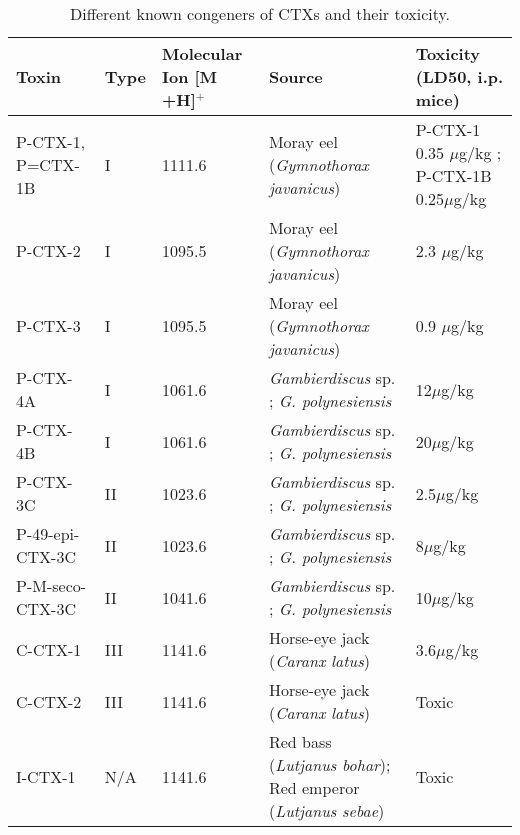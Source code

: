 \documentclass[12pt]{article}
\begin{document}
\begin{table}
\caption{Different known congeners of CTXs and their toxicity.}
\begin{tabular}{ |  p{2cm} | p{1.5cm} | p{2.5cm} | p{4cm} | p{4cm} | }
\hline
\textbf{Toxin} & \textbf{Type} & \textbf{Molecular Ion [M +H]$^{+}$} & \textbf{Source} & \textbf{Toxicity (LD50, i.p. mice)} \\
\hline
P-CTX-1, P=CTX-1B & I & 1111.6 & Moray eel (\emph{Gymnothorax javanicus}) \cite{murata1990structures,lewis1991purification} & P-CTX-1 0.35 $\mu$g/kg \cite{murata1990structures}; P-CTX-1B 0.25$\mu$g/kg \cite{lewis1991purification} \\
\hline
P-CTX-2 & I & 1095.5 \cite{lewis1991purification} & Moray eel (\emph{Gymnothorax javanicus}) \cite{lewis1991purification} & 2.3 $\mu$g/kg \cite{lewis1991purification} \\
\hline
 P-CTX-3 & I & 1095.5 \cite{lewis1991purification} & Moray eel (\emph{Gymnothorax javanicus}) \cite{lewis1991purification} & 0.9 $\mu$g/kg \cite{lewis1991purification} \\
\hline
 P-CTX-4A & I & 1061.6 \cite{yasumoto2000structural} & \emph{Gambierdiscus} sp. \cite{yasumoto2000structural}; \emph{G. polynesiensis} \cite{chinain2010growth} & 12$\mu$g/kg \cite{chinain2010growth} \\
\hline
 P-CTX-4B & I & 1061.6 \cite{yasumoto2000structural} & \emph{Gambierdiscus} sp. \cite{yasumoto2000structural}; \emph{G. polynesiensis} \cite{chinain2010growth} & 20$\mu$g/kg \cite{chinain2010growth}\\
\hline
 P-CTX-3C & II & 1023.6 \cite{satake1993structure} &  \emph{Gambierdiscus} sp. \cite{satake1993structure}; \emph{G. polynesiensis} \cite{chinain2010growth} & 2.5$\mu$g/kg \cite{chinain2010growth}\\
\hline
 P-49-epi-CTX-3C & II & 1023.6 \cite{chinain2010growth} & \emph{Gambierdiscus} sp. \cite{satake1993structure}; \emph{G. polynesiensis} \cite{chinain2010growth} & 8$\mu$g/kg\cite{chinain2010growth}\\
\hline
 P-M-seco-CTX-3C & II & 1041.6 \cite{chinain2010growth} &\emph{Gambierdiscus} sp. \cite{satake1993structure}; \emph{G. polynesiensis} \cite{chinain2010growth} & 10$\mu$g/kg \cite{chinain2010growth}\\
\hline
 C-CTX-1 & III & 1141.6 \cite{vernoux1997isolation,pottier2002characterisation} & Horse-eye jack (\emph{Caranx latus}) \cite{vernoux1997isolation,pottier2002characterisation} & 3.6$\mu$g/kg \cite{vernoux1997isolation}\\
\hline
 C-CTX-2 & III & 1141.6 \cite{vernoux1997isolation,pottier2002characterisation}& Horse-eye jack (\emph{Caranx latus}) \cite{vernoux1997isolation,pottier2002characterisation} & Toxic \cite{vernoux1997isolation}\\
\hline
 I-CTX-1 & N/A & 1141.6 \cite{hamilton2002isolation}& Red bass (\emph{Lutjanus bohar}); Red emperor (\emph{Lutjanus sebae}) \cite{hamilton2002isolation} & Toxic \cite{hamilton2002isolation} \\
\hline
\end{tabular}
\end{table}
\FloatBarrier
\end{document}
